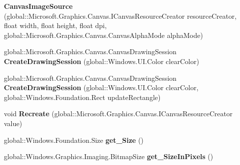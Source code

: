 \begin{DoxyCompactItemize}
{\bfseries Canvas\+Image\+Source} (global\+::\+Microsoft.\+Graphics.\+Canvas.\+I\+Canvas\+Resource\+Creator resource\+Creator, float width, float height, float dpi, global\+::\+Microsoft.\+Graphics.\+Canvas.\+Canvas\+Alpha\+Mode alpha\+Mode)
\item 
\mbox{\label{class_microsoft_1_1_graphics_1_1_canvas_1_1_u_i_1_1_xaml_1_1_canvas_image_source_a4252f5557def050fbeabcb6a457d4ec6}} 
global\+::\+Microsoft.\+Graphics.\+Canvas.\+Canvas\+Drawing\+Session {\bfseries Create\+Drawing\+Session} (global\+::\+Windows.\+U\+I.\+Color clear\+Color)
\item 
\mbox{\label{class_microsoft_1_1_graphics_1_1_canvas_1_1_u_i_1_1_xaml_1_1_canvas_image_source_ad904cc5b67ec7ea96ba67d9e7f9a7392}} 
global\+::\+Microsoft.\+Graphics.\+Canvas.\+Canvas\+Drawing\+Session {\bfseries Create\+Drawing\+Session} (global\+::\+Windows.\+U\+I.\+Color clear\+Color, global\+::\+Windows.\+Foundation.\+Rect update\+Rectangle)
\item 
\mbox{\label{class_microsoft_1_1_graphics_1_1_canvas_1_1_u_i_1_1_xaml_1_1_canvas_image_source_a0887999c04835ece8f184cdbf85b60be}} 
void {\bfseries Recreate} (global\+::\+Microsoft.\+Graphics.\+Canvas.\+I\+Canvas\+Resource\+Creator value)
\item 
\mbox{\label{class_microsoft_1_1_graphics_1_1_canvas_1_1_u_i_1_1_xaml_1_1_canvas_image_source_af6b41894fff7260ce3d135535154a2f8}} 
global\+::\+Windows.\+Foundation.\+Size {\bfseries get\+\_\+\+Size} ()
\item 
\mbox{\label{class_microsoft_1_1_graphics_1_1_canvas_1_1_u_i_1_1_xaml_1_1_canvas_image_source_a72c58fbab36a0813c0b2a0ad322cda40}} 
global\+::\+Windows.\+Graphics.\+Imaging.\+Bitmap\+Size {\bfseries get\+\_\+\+Size\+In\+Pixels} ()
\item 
\mbox{\label{class_microsoft_1_1_graphics_1_1_canvas_1_1_u_i_1_1_xaml_1_1_canvas_image_source_ab8ec1acb948333164b399e976958555c}} 

\end{DoxyCompactItemize}
